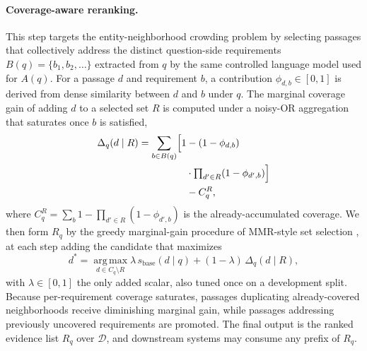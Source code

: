 \paragraph{Coverage-aware reranking.}
This step targets the entity-neighborhood crowding problem by
selecting passages that collectively address the distinct
question-side requirements $B(q)=\{b_1,b_2,\ldots\}$ extracted from
$q$ by the same controlled language model used for $A(q)$. For a
passage $d$ and requirement $b$, a contribution
$\phi_{d,b}\in[0,1]$ is derived from dense similarity between $d$
and $b$ under $q$. The marginal coverage gain of adding $d$ to a
selected set $R$ is computed under a noisy-OR aggregation that
saturates once $b$ is satisfied,
\begin{equation}
\label{eq:marginal-gain}
\begin{aligned}
\Delta_q(d \mid R)
=
\sum_{b \in B(q)}
\Bigl[
1
&{}-(1-\phi_{d,b})\\
&{}\cdot\textstyle\prod_{d'\in R}(1-\phi_{d',b})
\Bigr]\\
&{}- C_q^{R},
\end{aligned}
\end{equation}
where $C_q^{R}=\sum_b 1-\prod_{d'\in R}(1-\phi_{d',b})$ is the
already-accumulated coverage. We then form $R_q$ by the greedy
marginal-gain procedure of MMR-style set selection
\citep{carbonell1998mmr,lin2011submodular}, at each step adding the
candidate that maximizes
\begin{equation}
\label{eq:greedy-rerank}
d^{*}
=
\operatorname*{arg\,max}_{d \in C_q \setminus R}
\lambda\,s_{\mathrm{base}}(d \mid q)
+
(1-\lambda)\,\Delta_q(d \mid R),
\end{equation}
with $\lambda \in [0,1]$ the only added scalar, also tuned once on a
development split. Because per-requirement coverage saturates,
passages duplicating already-covered neighborhoods receive
diminishing marginal gain, while passages addressing previously
uncovered requirements are promoted. The final output is the ranked
evidence list $R_q$ over $\mathcal{D}$, and downstream systems may
consume any prefix of $R_q$.
